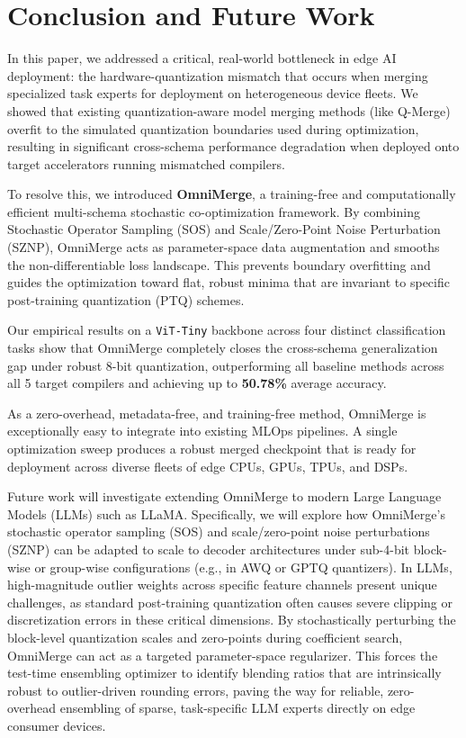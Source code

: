 \section{Conclusion and Future Work}
\label{sec:conclusion}

In this paper, we addressed a critical, real-world bottleneck in edge AI deployment: the hardware-quantization mismatch that occurs when merging specialized task experts for deployment on heterogeneous device fleets. We showed that existing quantization-aware model merging methods (like Q-Merge) overfit to the simulated quantization boundaries used during optimization, resulting in significant cross-schema performance degradation when deployed onto target accelerators running mismatched compilers.

To resolve this, we introduced \textbf{OmniMerge}, a training-free and computationally efficient multi-schema stochastic co-optimization framework. By combining Stochastic Operator Sampling (SOS) and Scale/Zero-Point Noise Perturbation (SZNP), OmniMerge acts as parameter-space data augmentation and smooths the non-differentiable loss landscape. This prevents boundary overfitting and guides the optimization toward flat, robust minima that are invariant to specific post-training quantization (PTQ) schemes.

Our empirical results on a \texttt{ViT-Tiny} backbone across four distinct classification tasks show that OmniMerge completely closes the cross-schema generalization gap under robust 8-bit quantization, outperforming all baseline methods across all 5 target compilers and achieving up to \textbf{50.78\%} average accuracy. 

As a zero-overhead, metadata-free, and training-free method, OmniMerge is exceptionally easy to integrate into existing MLOps pipelines. A single optimization sweep produces a robust merged checkpoint that is ready for deployment across diverse fleets of edge CPUs, GPUs, TPUs, and DSPs.

Future work will investigate extending OmniMerge to modern Large Language Models (LLMs) such as LLaMA. Specifically, we will explore how OmniMerge's stochastic operator sampling (SOS) and scale/zero-point noise perturbations (SZNP) can be adapted to scale to decoder architectures under sub-4-bit block-wise or group-wise configurations (e.g., in AWQ or GPTQ quantizers). In LLMs, high-magnitude outlier weights across specific feature channels present unique challenges, as standard post-training quantization often causes severe clipping or discretization errors in these critical dimensions. By stochastically perturbing the block-level quantization scales and zero-points during coefficient search, OmniMerge can act as a targeted parameter-space regularizer. This forces the test-time ensembling optimizer to identify blending ratios that are intrinsically robust to outlier-driven rounding errors, paving the way for reliable, zero-overhead ensembling of sparse, task-specific LLM experts directly on edge consumer devices.
